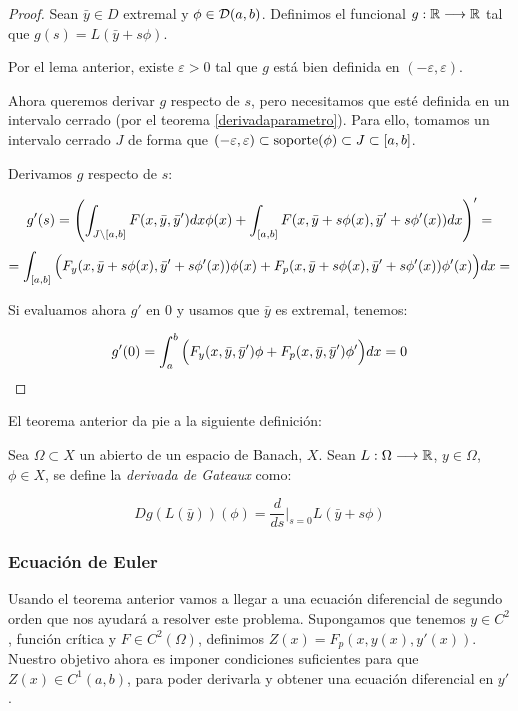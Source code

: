 \begin{proof}
Sean $\bar{y}\in D$ extremal y $\phi\in\mathcal{D}(a,b)$. Definimos el funcional $g:\mathbb{R}\longrightarrow\mathbb{R}$ tal que $g(s)=L(\bar{y}+s\phi)$.

Por el lema anterior, existe $\varepsilon>0$ tal que $g$ está bien definida en $(-\varepsilon,\varepsilon)$.

Ahora queremos derivar $g$ respecto de $s$, pero necesitamos que esté definida en un intervalo cerrado (por el teorema \ref{derivadaparametro}). Para ello, tomamos un intervalo cerrado $J$ de forma que $(-\varepsilon,\varepsilon)\subset\operatorname{soporte} (\phi)\subset J\subset [a,b]$. 

Derivamos $g$ respecto de $s$:

\[
g'(s)=\left(
\displaystyle\int_{ J\backslash [a,b] }^{  } F(x,\bar{y},\bar{y}')dx\phi(x)+
\displaystyle\int_{ [a,b] }^{  } F(x,\bar{y}+s\phi(x),\bar{y}'+s\phi'(x))dx
\right)'=
\]
\[
= \displaystyle\int_{ [a,b] }^{  } \Big(F_y(x,\bar{y}+s\phi(x),\bar{y}'+s\phi'(x))\phi(x)+F_p(x,\bar{y}+s\phi(x),\bar{y}'+s\phi'(x))\phi'(x)\Big)dx=
\]

Si evaluamos ahora $g'$ en 0 y usamos que $\bar{y}$ es extremal, tenemos:

\[
g'(0)=\displaystyle\int_{ a }^{ b } \Big(F_y(x,\bar{y},\bar{y}')\phi+F_p(x,\bar{y},\bar{y}')\phi'\Big)dx=0 
\]

\end{proof}

El teorema anterior da pie a la siguiente definición:

\begin{definition}
\label{gateaux}

Sea $\Omega\subset X$ un abierto de un espacio de Banach, $X$. Sean $L:\Omega\longrightarrow\mathbb{R}$, $y\in \Omega$, $\phi\in X$, se define la \textit{derivada de Gateaux} como:

\[
Dg(L(\bar{y}))(\phi)=\frac{d}{ds}\Big|_{s=0}L(\bar{y}+s\phi)
\]

\end{definition}

\subsubsection{Ecuación de Euler}

Usando el teorema anterior vamos a llegar a una ecuación diferencial de segundo orden que nos ayudará a resolver este problema. Supongamos que tenemos $y\in C^2$, función crítica y $F\in C^2(\Omega)$, definimos $Z(x)=F_p(x,y(x),y'(x))$.
Nuestro objetivo ahora es imponer condiciones suficientes para que $Z(x)\in C^1(a,b)$, para poder derivarla y obtener una ecuación diferencial en $y'$.

